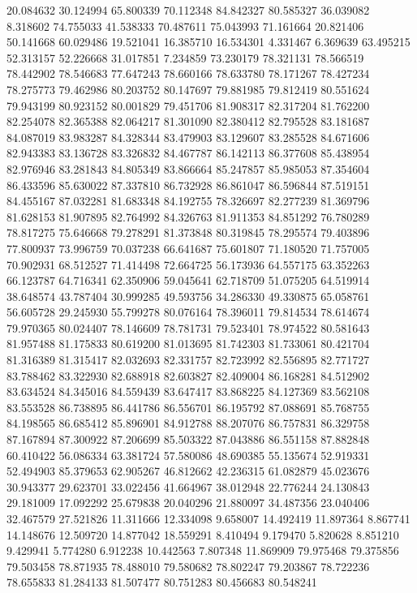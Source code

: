20.084632
30.124994
65.800339
70.112348
84.842327
80.585327
36.039082
8.318602
74.755033
41.538333
70.487611
75.043993
71.161664
20.821406
50.141668
60.029486
19.521041
16.385710
16.534301
4.331467
6.369639
63.495215
52.313157
52.226668
31.017851
7.234859
73.230179
78.321131
78.566519
78.442902
78.546683
77.647243
78.660166
78.633780
78.171267
78.427234
78.275773
79.462986
80.203752
80.147697
79.881985
79.812419
80.551624
79.943199
80.923152
80.001829
79.451706
81.908317
82.317204
81.762200
82.254078
82.365388
82.064217
81.301090
82.380412
82.795528
83.181687
84.087019
83.983287
84.328344
83.479903
83.129607
83.285528
84.671606
82.943383
83.136728
83.326832
84.467787
86.142113
86.377608
85.438954
82.976946
83.281843
84.805349
83.866664
85.247857
85.985053
87.354604
86.433596
85.630022
87.337810
86.732928
86.861047
86.596844
87.519151
84.455167
87.032281
81.683348
84.192755
78.326697
82.277239
81.369796
81.628153
81.907895
82.764992
84.326763
81.911353
84.851292
76.780289
78.817275
75.646668
79.278291
81.373848
80.319845
78.295574
79.403896
77.800937
73.996759
70.037238
66.641687
75.601807
71.180520
71.757005
70.902931
68.512527
71.414498
72.664725
56.173936
64.557175
63.352263
66.123787
64.716341
62.350906
59.045641
62.718709
51.075205
64.519914
38.648574
43.787404
30.999285
49.593756
34.286330
49.330875
65.058761
56.605728
29.245930
55.799278
80.076164
78.396011
79.814534
78.614674
79.970365
80.024407
78.146609
78.781731
79.523401
78.974522
80.581643
81.957488
81.175833
80.619200
81.013695
81.742303
81.733061
80.421704
81.316389
81.315417
82.032693
82.331757
82.723992
82.556895
82.771727
83.788462
83.322930
82.688918
82.603827
82.409004
86.168281
84.512902
83.634524
84.345016
84.559439
83.647417
83.868225
84.127369
83.562108
83.553528
86.738895
86.441786
86.556701
86.195792
87.088691
85.768755
84.198565
86.685412
85.896901
84.912788
88.207076
86.757831
86.329758
87.167894
87.300922
87.206699
85.503322
87.043886
86.551158
87.882848
60.410422
56.086334
63.381724
57.580086
48.690385
55.135674
52.919331
52.494903
85.379653
62.905267
46.812662
42.236315
61.082879
45.023676
30.943377
29.623701
33.022456
41.664967
38.012948
22.776244
24.130843
29.181009
17.092292
25.679838
20.040296
21.880097
34.487356
23.040406
32.467579
27.521826
11.311666
12.334098
9.658007
14.492419
11.897364
8.867741
14.148676
12.509720
14.877042
18.559291
8.410494
9.179470
5.820628
8.851210
9.429941
5.774280
6.912238
10.442563
7.807348
11.869909
79.975468
79.375856
79.503458
78.871935
78.488010
79.580682
78.802247
79.203867
78.722236
78.655833
81.284133
81.507477
80.751283
80.456683
80.548241
